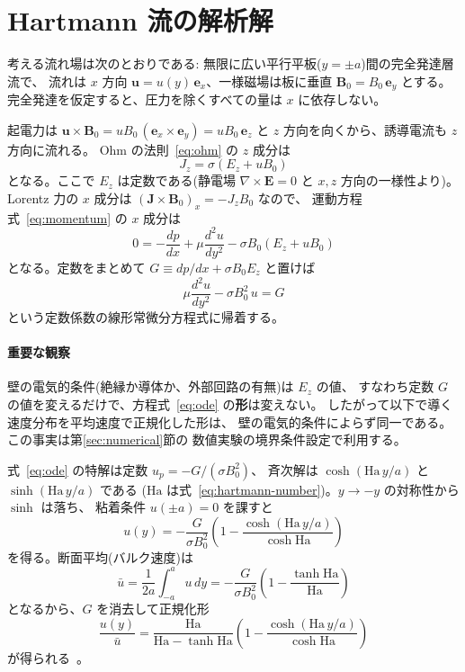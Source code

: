 \documentclass{ltjsarticle}   %
\newcommand{\Ha}{\mathrm{Ha}}
\begin{document}
\section{Hartmann 流の解析解}
\label{sec:analytic}

考える流れ場は次のとおりである: 無限に広い平行平板($y=\pm a$)間の完全発達層流で、
流れは $x$ 方向 $\boldsymbol{u}=u(y)\,\boldsymbol{e}_x$、一様磁場は板に垂直
$\boldsymbol{B}_0=B_0\,\boldsymbol{e}_y$ とする。
完全発達を仮定すると、圧力を除くすべての量は $x$ に依存しない。

起電力は $\boldsymbol{u}\times\boldsymbol{B}_0
= u B_0\,(\boldsymbol{e}_x\times\boldsymbol{e}_y) = u B_0\,\boldsymbol{e}_z$
と $z$ 方向を向くから、誘導電流も $z$ 方向に流れる。
Ohm の法則~\eqref{eq:ohm} の $z$ 成分は
\begin{equation}
  J_z = \sigma\left(E_z + u B_0\right)
  \label{eq:jz}
\end{equation}
となる。ここで $E_z$ は定数である(静電場 $\nabla\times\boldsymbol{E}=0$ と
$x,z$ 方向の一様性より)。Lorentz 力の $x$ 成分は
$(\boldsymbol{J}\times\boldsymbol{B}_0)_x = -J_z B_0$ なので、
運動方程式~\eqref{eq:momentum} の $x$ 成分は
\begin{equation}
  0 = -\frac{dp}{dx} + \mu\frac{d^2u}{dy^2} - \sigma B_0\left(E_z + u B_0\right)
\end{equation}
となる。定数をまとめて $G \equiv dp/dx + \sigma B_0 E_z$ と置けば
\begin{equation}
  \mu\frac{d^2u}{dy^2} - \sigma B_0^2\, u = G
  \label{eq:ode}
\end{equation}
という定数係数の線形常微分方程式に帰着する。

\paragraph{重要な観察}
壁の電気的条件(絶縁か導体か、外部回路の有無)は $E_z$ の値、
すなわち定数 $G$ の値を変えるだけで、方程式~\eqref{eq:ode} の\textbf{形}は変えない。
したがって以下で導く速度分布を平均速度で正規化した形は、
壁の電気的条件によらず同一である。この事実は第\ref{sec:numerical}節の
数値実験の境界条件設定で利用する。

式~\eqref{eq:ode} の特解は定数 $u_p = -G/(\sigma B_0^2)$、
斉次解は $\cosh(\Ha\, y/a)$ と $\sinh(\Ha\, y/a)$ である
($\Ha$ は式~\eqref{eq:hartmann-number})。$y\to-y$ の対称性から $\sinh$ は落ち、
粘着条件 $u(\pm a)=0$ を課すと
\begin{equation}
  u(y) = -\frac{G}{\sigma B_0^2}
  \left(1 - \frac{\cosh(\Ha\, y/a)}{\cosh\Ha}\right)
  \label{eq:profile-raw}
\end{equation}
を得る。断面平均(バルク速度)は
\begin{equation}
  \bar{u} = \frac{1}{2a}\int_{-a}^{a} u\,dy
  = -\frac{G}{\sigma B_0^2}\left(1 - \frac{\tanh\Ha}{\Ha}\right)
\end{equation}
となるから、$G$ を消去して正規化形
\begin{equation}
  \boxed{\;
  \frac{u(y)}{\bar{u}}
  = \frac{\Ha}{\Ha - \tanh\Ha}
    \left(1 - \frac{\cosh(\Ha\, y/a)}{\cosh\Ha}\right)
  \;}
  \label{eq:profile}
\end{equation}
が得られる~\cite{hartmann1937}。
\end{document}
